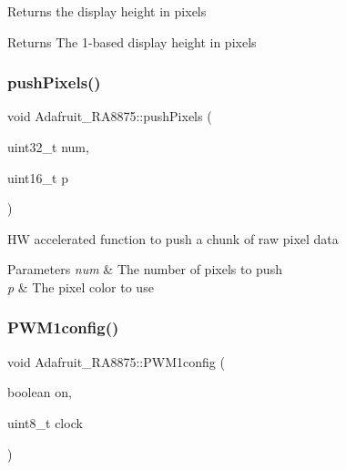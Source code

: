Returns the display height in pixels

\begin{DoxyReturn}{Returns}
The 1-\/based display height in pixels 
\end{DoxyReturn}
\mbox{\label{class_adafruit___r_a8875_a56ee5cb7ee6909234b33d43d6ccad151}} 
\subsubsection{\texorpdfstring{pushPixels()}{pushPixels()}}
{\footnotesize\ttfamily void Adafruit\+\_\+\+R\+A8875\+::push\+Pixels (\begin{DoxyParamCaption}\item[{uint32\+\_\+t}]{num,  }\item[{uint16\+\_\+t}]{p }\end{DoxyParamCaption})}

HW accelerated function to push a chunk of raw pixel data


\begin{DoxyParams}{Parameters}
{\em num} & The number of pixels to push \\
\hline
{\em p} & The pixel color to use \\
\hline
\end{DoxyParams}
\mbox{\label{class_adafruit___r_a8875_ae5ec83867df1220ae6247fc614e3b61f}} 
\subsubsection{\texorpdfstring{PWM1config()}{PWM1config()}}
{\footnotesize\ttfamily void Adafruit\+\_\+\+R\+A8875\+::\+P\+W\+M1config (\begin{DoxyParamCaption}\item[{boolean}]{on,  }\item[{uint8\+\_\+t}]{clock }\end{DoxyParamCaption})}

\mbox{\label{class_adafruit___r_a8875_aa9aff213337d70839995d50e6a88ba5c}} 
